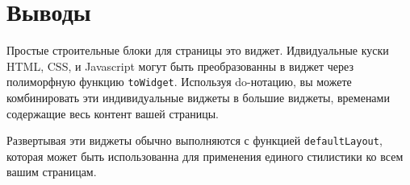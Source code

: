 \section{Выводы}

Простые строительные блоки для страницы это виджет. Идвидуальные куски HTML, CSS, и Javascript могут быть преобразованны в виджет через полиморфную функцию \lstinline'toWidget'. Используя do-нотацию, вы можете комбинировать эти индивидуальные виджеты в большие виджеты, временами содержащие весь контент вашей страницы.

Развертывая эти виджеты обычно выполняются с функцией \lstinline'defaultLayout', которая может быть использованна для применения единого стилистики ко всем вашим страницам.

